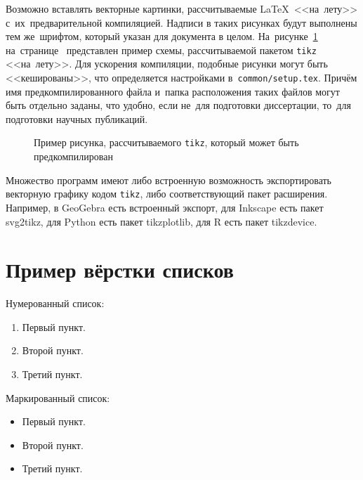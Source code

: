 Возможно вставлять векторные картинки, рассчитываемые \LaTeX\ <<на~лету>>
с~их~предварительной компиляцией. Надписи в таких рисунках будут выполнены
тем же~шрифтом, который указан для документа в целом.
На~рисунке~\cref{fig:tikz_example} на~странице~\pageref{fig:tikz_example}
представлен пример схемы, рассчитываемой пакетом \verb|tikz| <<на~лету>>.
Для ускорения компиляции, подобные рисунки могут быть <<кешированы>>, что
определяется настройками в~\verb|common/setup.tex|.
Причём имя предкомпилированного
файла и~папка расположения таких файлов могут быть отдельно заданы,
что удобно, если не~для подготовки диссертации,
то~для подготовки научных публикаций.
\begin{figure}[ht]
    \legend{}
    \caption[Пример \texttt{tikz} схемы]{Пример рисунка, рассчитываемого
        \texttt{tikz}, который может быть предкомпилирован}\label{fig:tikz_example}
\end{figure}

Множество программ имеют либо встроенную возможность экспортировать векторную
графику кодом \verb|tikz|, либо соответствующий пакет расширения.
Например, в GeoGebra есть встроенный экспорт,
для Inkscape есть пакет svg2tikz,
для Python есть пакет tikzplotlib,
для R есть пакет tikzdevice.

\section{Пример вёрстки списков}\label{sec:ch2/sec3}

\noindent Нумерованный список:
\begin{enumerate}
    \item Первый пункт.
    \item Второй пункт.
    \item Третий пункт.
\end{enumerate}

\noindent Маркированный список:
\begin{itemize}
    \item Первый пункт.
    \item Второй пункт.
    \item Третий пункт.
\end{itemize}


